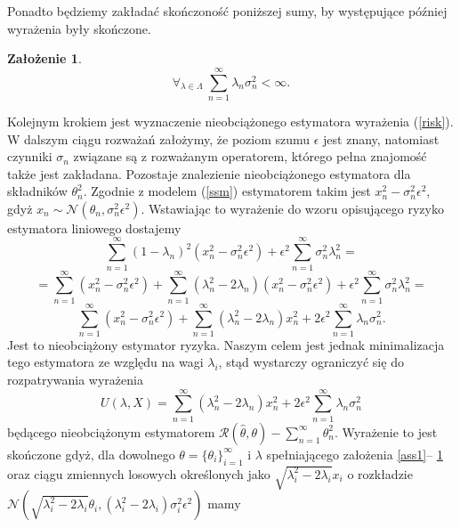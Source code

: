 \documentclass{mwart}
\newtheorem{za}{Założenie}
\begin{document}
\indent Ponadto będziemy zakładać skończoność poniższej sumy, by występujące później wyrażenia były skończone.
\begin{za}\label{ass3}
\begin{displaymath}
\forall_{\lambda\in \Lambda}\ \sum_{n=1}^{\infty}\lambda_n\sigma_n^2<\infty.
\end{displaymath}
\end{za}
\indent Kolejnym krokiem jest wyznaczenie nieobciążonego estymatora wyrażenia (\ref{risk}). W dalszym ciągu rozważań założymy, że poziom szumu $\epsilon$ jest znany, natomiast czynniki $\sigma_n$ związane są z rozważanym operatorem, którego pełna znajomość także jest zakładana. Pozostaje znalezienie nieobciążonego estymatora dla składników $\theta_n^2$. Zgodnie z modelem (\ref{ssm}) estymatorem takim jest $x_n^2-\sigma_n^2\epsilon^2$, gdyż $x_n\sim \mathcal{N}(\theta_n,\sigma_n^2\epsilon^2)$. Wstawiając to wyrażenie do wzoru opisującego ryzyko estymatora liniowego dostajemy
\begin{displaymath}
\sum_{n=1}^{\infty}(1-\lambda_n)^2(x_n^2-\sigma_n^2\epsilon^2)+\epsilon^2\sum_{n=1}^{\infty}\sigma_n^2\lambda_n^2=
\end{displaymath}
\begin{displaymath}
=\sum_{n=1}^{\infty}(x_n^2-\sigma_n^2\epsilon^2)+\sum_{n=1}^{\infty}(\lambda_n^2-2\lambda_n)(x_n^2-\sigma_n^2\epsilon^2)+\epsilon^2\sum_{n=1}^{\infty}\sigma_n^2\lambda_n^2=
\end{displaymath}
\begin{displaymath}
\sum_{n=1}^{\infty}(x_n^2-\sigma_n^2\epsilon^2)+\sum_{n=1}^{\infty}(\lambda_n^2-2\lambda_n)x_n^2+2\epsilon^2\sum_{n=1}^{\infty}\lambda_n\sigma_n^2.
\end{displaymath}
Jest to nieobciążony estymator ryzyka. Naszym celem jest jednak minimalizacja tego estymatora ze względu na wagi $\lambda_i$, stąd wystarczy ograniczyć się do rozpatrywania wyrażenia 
\begin{equation}\label{ure}
U(\lambda,X)=\sum_{n=1}^{\infty}(\lambda_n^2-2\lambda_n)x_n^2+2\epsilon^2\sum_{n=1}^{\infty}\lambda_n\sigma_n^2
\end{equation}
będącego nieobciążonym estymatorem $\mathcal{R}(\hat{\theta},\theta)-\sum_{n=1}^{\infty}\theta_n^2$. Wyrażenie to jest skończone gdyż, dla dowolnego $\theta=\{\theta_i\}_{i=1}^{\infty}$ i $\lambda$ spełniającego założenia \ref{ass1}-- \ref{ass3} oraz ciągu zmiennych losowych określonych jako $\sqrt{\lambda_i^2-2\lambda_i}x_i$ o rozkładzie $\mathcal{N}(\sqrt{\lambda_i^2-2\lambda_i}\theta_i,(\lambda_i^2-2\lambda_i)\sigma_i^2\epsilon^2)$ mamy
\end{document}

